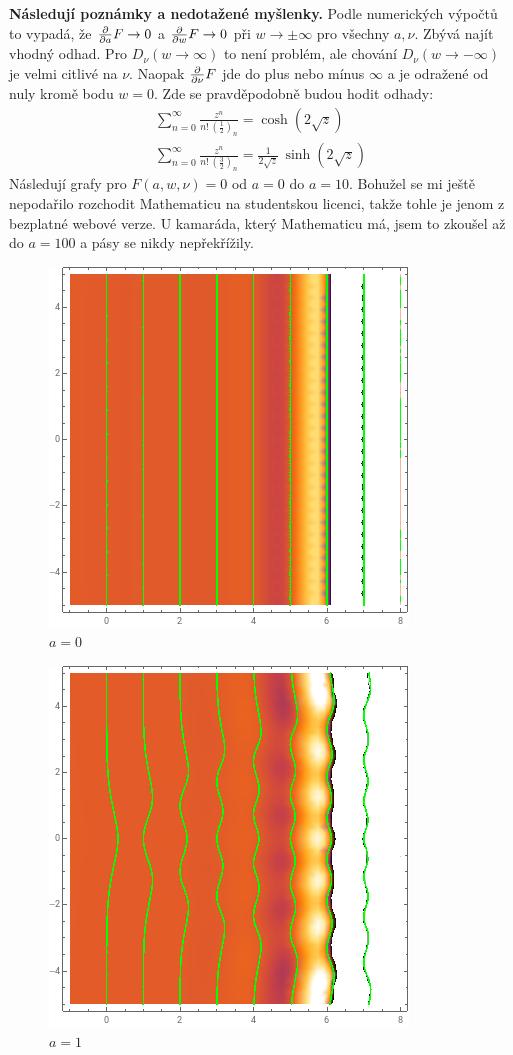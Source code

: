 \textbf{Následují poznámky a nedotažené myšlenky.} Podle numerických výpočtů to vypadá, že $\frac{\partial }{\partial a} F \to 0$ a $\frac{\partial }{\partial w} F \to 0$ při $w\to\pm\infty$ pro všechny $a, \nu$. Zbývá najít vhodný odhad. Pro $D_\nu(w \to \infty)$ to není problém, ale chování $D_\nu(w\to -\infty)$ je velmi citlivé na $\nu$. Naopak $\frac{\partial }{\partial \nu} F$ jde do plus nebo mínus $\infty$ a je odražené od nuly kromě bodu $w=0$. Zde se pravděpodobně budou hodit odhady:
\begin{gather*}
    \sum_{n=0}^\infty \frac{z^n}{n! \, (\tfrac{1}{2})_n}
    = \cosh(2 \sqrt{z})
    \\[5pt]
    \sum_{n=0}^\infty \frac{z^n}{n! \, (\tfrac{3}{2})_n}
    = \frac{1}{2\sqrt{z}} \, \sinh(2 \sqrt{z})
\end{gather*}
Následují grafy pro $F(a,w,\nu) = 0$ od $a=0$ do $a=10$. Bohužel se mi ještě nepodařilo rozchodit Mathematicu na studentskou licenci, takže tohle je jenom z bezplatné webové verze. U kamaráda, který Mathematicu má, jsem to zkoušel až do $a=100$ a pásy se nikdy nepřekřížily.
\begin{figure}[h!]
    \centering
    \includegraphics{../img/dirac_0.png}
    \caption{$a=0$}
\end{figure}
\begin{figure}[h!]
    \centering
    \includegraphics{../img/dirac_1.png}
    \caption{$a=1$}
\end{figure}
